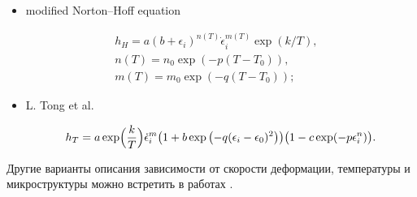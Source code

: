 \begin{itemize}
\begin{equation}

\begin{split}

	 h_{NN}= &a\Bigl(1-b\Bigl(\ln\frac{\dot{\epsilon}_i}{\dot{\epsilon}_{\ast}}+\ln\vartheta(\epsilon_i,T)\Bigr)^q\Bigr)^p

	\vartheta(\epsilon_i,T)+k\epsilon_i^n,\\

	& \vartheta(\epsilon_i,T)=1+c\Bigl(1-\Bigl(\frac{T}{T_{\ast}}\Bigr)^2\Bigr)\epsilon_i^{1/2};

\end{split}

\end{equation}



\item[--]

modified Norton--Hoff equation \cite[p.~66]{keller:bib:hu}

\begin{equation}

\begin{split}

	 h_{H}= a(b+\epsilon_i)^{n(T)}\dot{\epsilon}_i^{m(T)}\exp({k}/{T}),&\\

	  n(T)=n_0\exp(-p(T-T_0)),&\\

	  m(T)=m_0\exp(-q(T-T_0));&

\end{split}

\end{equation}



\item[--]

L. Tong et al. \cite{keller:bib:tong}

\begin{equation}

	h_T=a\exp\Bigl(\frac{k}{T}\Bigr)\dot{\epsilon}_i^m\bigl(1+b\exp\left(-q(\epsilon_i-\epsilon_0)^2\right)\bigr)\bigl(1-c\exp(-p\epsilon_i^n)\bigr).

\end{equation}



\end{itemize}



Другие варианты описания зависимости от скорости деформации, температуры и микроструктуры можно встретить в работах \cite{keller:bib:hu, keller:bib:tong, keller:bib:panicker, keller:bib:lang, keller:bib:Voce-1, keller:bib:Voce-2}.



